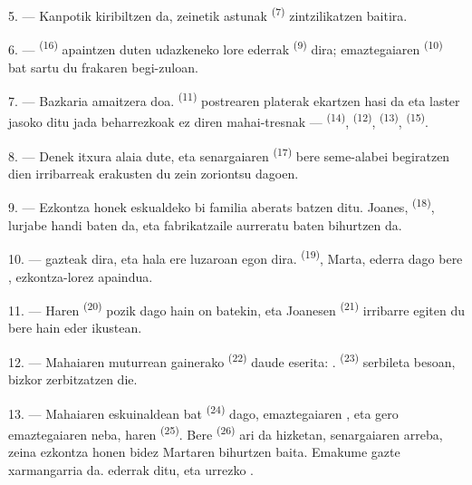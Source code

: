 5. --- Kanpotik   kiribiltzen da, zeinetik
 astunak \textsuperscript{(7)} zintzilikatzen baitira.

6. ---  \textsuperscript{(16)} apaintzen duten udazkeneko lore
ederrak  \textsuperscript{(9)} dira; emaztegaiaren
 \textsuperscript{(10)} bat sartu du frakaren begi-zuloan.

7. --- Bazkaria amaitzera doa.  \textsuperscript{(11)}
postrearen platerak ekartzen hasi da eta laster jasoko ditu jada beharrezkoak ez
diren mahai-tresnak ---  \textsuperscript{(14)},
 \textsuperscript{(12)}, 
\textsuperscript{(13)},  \textsuperscript{(15)}.

\VUsaut{3.0mm}

8. --- Denek itxura alaia dute, eta senargaiaren 
\textsuperscript{(17)} bere seme-alabei begiratzen dien irribarreak erakusten du
zein zoriontsu dagoen.

9. --- Ezkontza honek eskualdeko bi familia aberats batzen ditu. Joanes,
 \textsuperscript{(18)}, lurjabe handi baten  da,
eta fabrikatzaile aurreratu baten  bihurtzen da.

10. ---  gazteak dira, eta hala ere luzaroan
 egon dira.  \textsuperscript{(19)},
Marta, ederra dago bere , ezkontza-lorez apaindua.

11. --- Haren  \textsuperscript{(20)} pozik dago
 hain on batekin, eta Joanesen 
\textsuperscript{(21)} irribarre egiten du bere  hain eder ikustean.

12. --- Mahaiaren muturrean gainerako 
\textsuperscript{(22)} daude eserita: .
 \textsuperscript{(23)} serbileta besoan, bizkor
zerbitzatzen die.

\VUsaut{3.0mm}

13. --- Mahaiaren eskuinaldean  bat \textsuperscript{(24)} dago,
emaztegaiaren , eta gero emaztegaiaren neba, haren
 \textsuperscript{(25)}. Bere 
\textsuperscript{(26)} ari da hizketan, senargaiaren arreba, zeina ezkontza honen
bidez Martaren  bihurtzen baita. Emakume gazte xarmangarria da.
 ederrak ditu,  eta urrezko
.

